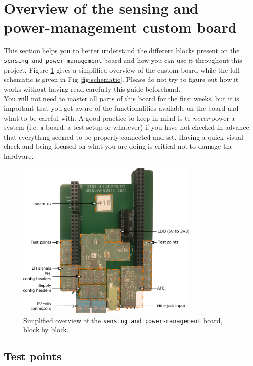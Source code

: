 \clearpage
\section{Overview of the sensing and power-management custom board} \label{sec:custom}

This section helps you to better understand the different blocks present on the \texttt{sensing and power management} board and how you can use it throughout this project. Figure \ref{fig:pcb-overview} gives a simplified overview of the custom board while the full schematic is given in Fig \ref{fig:schematic}. Please do not try to figure out how it works without having read carefully this guide beforehand. \\

You will not need to master all parts of this board for the first weeks, but it is important that you get aware of the functionalities available on the board and what to be careful with. A good practice to keep in mind is to \textit{never} power a system (i.e. a board, a test setup or whatever) if you have not checked in advance that everything seemed to be properly connected and set. Having a quick visual check and being focused on what you are doing is critical not to damage the hardware.

\begin{figure}[h!]
    \centering
    \includegraphics[width=0.8\textwidth]{figs/pcb-overview.png}
    \caption{Simplified overview of the \texttt{sensing and power-management} board, block by block.}
    \label{fig:pcb-overview}
\end{figure}

\clearpage
\subsection{Test points}

